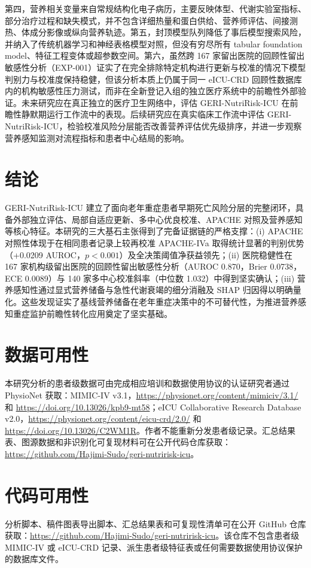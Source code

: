 \documentclass[11pt]{ctexart}
\begin{document}
第四，营养相关变量来自常规结构化电子病历，主要反映体型、代谢实验室指标、部分治疗过程和缺失模式，并不包含详细热量和蛋白供给、营养师评估、间接测热、体成分影像或纵向营养轨迹。第五，封顶模型队列降低了事后模型搜索风险，并纳入了传统机器学习和神经表格模型对照，但没有穷尽所有 tabular foundation model、特征工程变体或超参数空间。第六，虽然跨 167 家留出医院的回顾性留出敏感性分析（EXP-001）证实了在完全排除特定机构进行更新与校准的情况下模型判别力与校准度保持稳健，但该分析本质上仍属于同一 eICU-CRD 回顾性数据库内的机构敏感性压力测试，而非在全新登记入组的独立医疗系统中的前瞻性外部验证。未来研究应在真正独立的医疗卫生网络中，评估 GERI-NutriRisk-ICU 在前瞻性静默期运行工作流中的表现。后续研究应在真实临床工作流中评估 GERI-NutriRisk-ICU，检验校准风险分层能否改善营养评估优先级排序，并进一步观察营养感知监测对流程指标和患者中心结局的影响。

\section{结论}
GERI-NutriRisk-ICU 建立了面向老年重症患者早期死亡风险分层的完整闭环，具备外部独立评估、局部自适应更新、多中心优良校准、APACHE 对照及营养感知等核心特征。本研究的三大基石主张得到了完备证据链的严格支撑：(i) APACHE 对照性体现于在相同患者记录上较再校准 APACHE-IVa 取得统计显著的判别优势（+0.0209 AUROC，$p<0.001$）及全决策阈值净获益领先；(ii) 医院稳健性在 167 家机构级留出医院的回顾性留出敏感性分析（AUROC 0.870，Brier 0.0738，ECE 0.0089）与 140 家多中心校准斜率（中位数 1.032）中得到坚实确认；(iii) 营养感知性通过显式营养储备与急性代谢衰竭的细分消融及 SHAP 归因得以明确量化。这些发现证实了基线营养储备在老年重症决策中的不可替代性，为推进营养感知重症监护前瞻性转化应用奠定了坚实基础。

\section*{数据可用性}
本研究分析的患者级数据可由完成相应培训和数据使用协议的认证研究者通过 PhysioNet 获取：MIMIC-IV v3.1，\url{https://physionet.org/content/mimiciv/3.1/} 和 \url{https://doi.org/10.13026/kpb9-mt58}；eICU Collaborative Research Database v2.0，\url{https://physionet.org/content/eicu-crd/2.0/} 和 \url{https://doi.org/10.13026/C2WM1R}。作者不能重新分发患者级记录。汇总结果表、图源数据和非识别化可复现材料可在公开代码仓库获取：\url{https://github.com/Hajimi-Sudo/geri-nutririsk-icu}。

\section*{代码可用性}
分析脚本、稿件图表导出脚本、汇总结果表和可复现性清单可在公开 GitHub 仓库获取：\url{https://github.com/Hajimi-Sudo/geri-nutririsk-icu}。该仓库不包含患者级 MIMIC-IV 或 eICU-CRD 记录、派生患者级特征表或任何需要数据使用协议保护的数据库文件。
\end{document}
